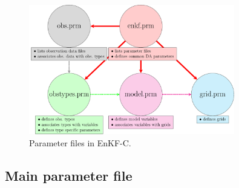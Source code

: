 \documentclass[11pt]{report}
\begin{document}
\begin{figure}[h]
  \centering
  \includegraphics[width=0.8\textwidth]{plots/prm.pdf}
  \caption{Parameter files in EnKF-C.}
  \label{fig:prm}
\end{figure}

\subsection{Main parameter file}
\label{sec:mainprm}
\end{document}
